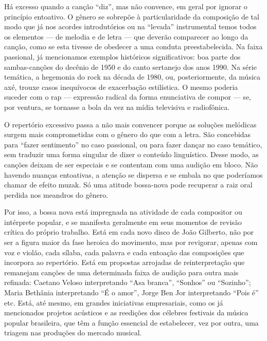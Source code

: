 Há excesso quando a canção ``diz'', mas não convence, em geral por
ignorar o princípio entoativo. O gênero se sobrepõe à particularidade da
composição de tal modo que já nos acordes introdutórios ou na ``levada''
instrumental temos todos os elementos --- de melodia e de letra --- que
deverão comparecer ao longo da canção, como se esta tivesse de obedecer
a uma conduta preestabelecida. Na faixa passional, já mencionamos
exemplos históricos significativos: boa parte dos sambas-canções do
decênio de 1950 e do canto sertanejo dos anos 1990. Na série temática, a
hegemonia do rock na década de 1980, ou, posteriormente, da música axé,
trouxe casos inequívocos de exacerbação estilística. O mesmo poderia
suceder com o rap --- expressão radical da forma enunciativa de compor
--- se, por ventura, se tornasse a bola da vez na mídia televisiva e
radiofônica.

O repertório excessivo passa a não mais convencer porque as soluções
melódicas surgem mais comprometidas com o gênero do que com a letra. São
concebidas para ``fazer sentimento'' no caso passional, ou para fazer
dançar no caso temático, sem traduzir uma forma singular de dizer o
conteúdo linguístico. Desse modo, as canções deixam de ser especiais e
se contentam com uma audição em bloco. Não havendo nuanças entoativas, a
atenção se dispersa e se embala no que poderíamos chamar de efeito
muzak. Só uma atitude bossa-nova pode recuperar a raiz oral perdida nos
meandros do gênero.

Por isso, a bossa nova está impregnada na atividade de cada compositor
ou intérprete popular, e se manifesta geralmente em seus momentos de
revisão crítica do próprio trabalho. Está em cada novo disco de João
Gilberto, não por ser a figura maior da fase heroica do movimento, mas
por revigorar, apenas com voz e violão, cada sílaba, cada palavra e cada
entoação das composições que incorpora ao repertório. Está em propostas
arrojadas de reinterpretação que remanejam canções de uma determinada
faixa de audição para outra mais refinada: Caetano Veloso interpretando
``Asa branca'', ``Sonhos'' ou ``Sozinho''; Maria Bethânia interpretando
``É o amor'', Jorge Ben Jor interpretando ``Pois é'' etc. Está, até
mesmo, em grandes iniciativas empresariais, como os já mencionados
projetos acústicos e as reedições dos célebres festivais da música
popular brasileira, que têm a função essencial de estabelecer, vez por
outra, uma triagem nas produções do mercado musical.

